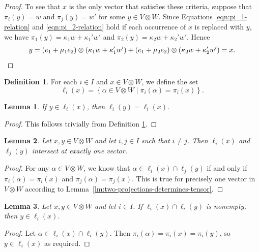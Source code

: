 \documentclass[10pt]{amsart}
\theoremstyle{definition}
\newtheorem{defi}[defi]{Definition}
\theoremstyle{plain}
\newtheorem{lemma}[lemma]{Lemma}
\theoremstyle{plain}
\theoremstyle{plain}
\theoremstyle{plain}
\begin{document}
\begin{proof}
To see that $x$ is the only vector that satisfies these criteria, suppose that $\pi_i{\left(y \right)} = w$ and $\pi_j{\left(y \right)} = w'$ for some $y \in V \otimes W$. Since Equations \eqref{eqn:pi_1-relation} and \eqref{eqn:pi_2-relation} hold if each occurrence of $x$ is replaced with $y$, we have $\pi_1{\left(y \right)} = \kappa_1 w + \kappa_1' w'$ and $\pi_2{\left(y \right)} = \kappa_2 w + \kappa_2' w'$. Hence
\begin{displaymath}
    y = \left(e_1 + \mu_1 e_2 \right) \otimes \left(\kappa_1 w + \kappa_1' w' \right) + \left(e_1 + \mu_2 e_2 \right) \otimes \left(\kappa_2 w + \kappa_2' w' \right) = x.\qedhere
\end{displaymath}
\end{proof}

\begin{defi} \label{def:cliques}
For each $i \in I$ and $x \in V \otimes W$, we define the set
\begin{displaymath}
    \ell_i{\left(x \right)} = {\left\{\alpha \in V \otimes W \mid \pi_i{\left(\alpha \right)} = \pi_i{\left(x \right)}\right\}}.
\end{displaymath}
\end{defi}

\begin{lemma} \label{lm:clique-equivalence}
If $y \in \ell_i{\left(x \right)}$, then $\ell_i{\left(y \right)} = \ell_i{\left(x \right)}$.
\end{lemma}
\begin{proof}
This follows trivially from Definition \ref{def:cliques}.
\end{proof}

\begin{lemma} \label{lm:clique-intersection}
Let $x, y \in V \otimes W$ and let $i, j \in I$ such that $i \neq j$. Then $\ell_i{\left(x \right)}$ and $\ell_j{\left(y \right)}$ intersect at exactly one vector.
\end{lemma}
\begin{proof}
For any $\alpha \in V \otimes W$, we know that $\alpha \in \ell_i{\left(x \right)} \cap \ell_j{\left(y \right)}$ if and only if $\pi_i{\left(\alpha \right)} = \pi_i{\left(x \right)}$ and $\pi_j{\left(\alpha \right)} = \pi_j{\left(x \right)}$. This is true for precisely one vector in $V \otimes W$ according to Lemma~\ref{lm:two-projections-determines-tensor}.
\end{proof}

\begin{lemma} \label{lm:parallel-cliques}
Let $x, y \in V \otimes W$ and let $i \in I$. If $\ell_i{\left(x \right)} \cap \ell_i{\left(y \right)}$ is nonempty, then $y \in \ell_i{\left(x \right)}$.
\end{lemma}
\begin{proof}
Let $\alpha \in \ell_i{\left(x \right)} \cap \ell_i{\left(y \right)}$. Then $\pi_i{\left(\alpha \right)} = \pi_i{\left(x \right)} = \pi_i{\left(y \right)}$, so $y \in \ell_i{\left(x \right)}$ as required.
\end{proof}
\end{document}
